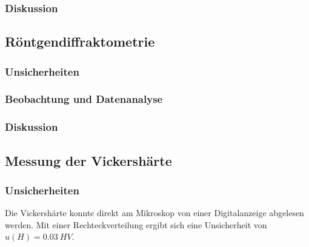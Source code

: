 \documentclass[
	a4paper,
	12pt,
	pagesize,
	ngerman
]{scrartcl}
\begin{document}
	\subsubsection{Diskussion}

	\subsection{Röntgendiffraktometrie}
	\subsubsection{Unsicherheiten}
	\subsubsection{Beobachtung und Datenanalyse}
	\subsubsection{Diskussion}

	\subsection{Messung der Vickershärte}
	\subsubsection{Unsicherheiten}
	Die Vickershärte konnte direkt am Mikroskop von einer Digitalanzeige abgelesen werden.
	Mit einer Rechteckverteilung ergibt sich eine Unsicherheit von $u(H) = \SI{0.03}{HV}$.
\end{document}
